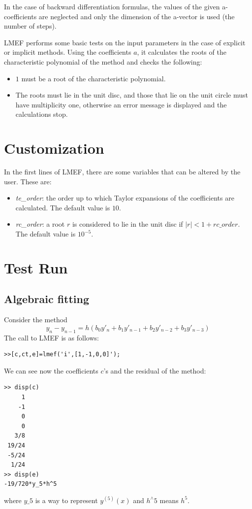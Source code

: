 \documentclass[acmtoms,acmnow]{acmtrans2m}
\begin{document}
In the case of backward differentiation formulas, the values of the given a-coefficients are neglected and only the dimension of the a-vector is used (the number of steps). 

LMEF performs some basic tests on the input parameters in the case of explicit or implicit methods. Using the coefficients $a$, it calculates the roots of the characteristic polynomial of the method and checks the following:
\begin{itemize}
\item $1$ must be a root of the characteristic polynomial. 
\item The roots must lie in the unit disc, and those that lie on the unit circle must have multiplicity one, otherwise an error message is displayed and the calculations stop.
\end{itemize}


\section{Customization}
In the first lines of LMEF, there are some variables that can be altered by the user. These are:
\begin{itemize}
 \item \textit{te\_order}: the order up to which Taylor expansions of the coefficients are calculated. The default value is $10$.
\item \textit{rc\_order}: a root $r$ is considered to lie in the unit disc if $|r|<1+rc\_order$. The default value is $10^{-5}$.
\end{itemize}

\section{Test Run}
\subsection{Algebraic fitting}
Consider the method
\begin{equation}
y_n-y_{n-1}=h\left(b_0y'_{n}+b_1y'_{n-1}+b_2y'_{n-2}+b_3y'_{n-3}\right)
\nonumber
\end{equation}
The call to LMEF is as follows:
\begin{verbatim}
>>[c,ct,e]=lmef('i',[1,-1,0,0]');
\end{verbatim}
We can see now the coefficients $c$'s and the residual of the
method:
\begin{verbatim}
>> disp(c)
     1
    -1
     0
     0
   3/8
 19/24
 -5/24
  1/24
>> disp(e)
-19/720*y_5*h^5
\end{verbatim}
where $y\_5$ is a way to represent $y^{(5)}(x)$ and $h^{\wedge} 5$
means $h^5$.
\end{document}
